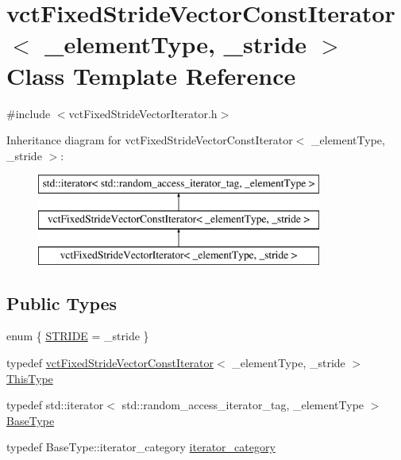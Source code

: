 \hypertarget{classvct_fixed_stride_vector_const_iterator}{}\section{vct\+Fixed\+Stride\+Vector\+Const\+Iterator$<$ \+\_\+element\+Type, \+\_\+stride $>$ Class Template Reference}
\label{classvct_fixed_stride_vector_const_iterator}


{\ttfamily \#include $<$vct\+Fixed\+Stride\+Vector\+Iterator.\+h$>$}

Inheritance diagram for vct\+Fixed\+Stride\+Vector\+Const\+Iterator$<$ \+\_\+element\+Type, \+\_\+stride $>$\+:\begin{figure}[H]
\begin{center}
\leavevmode
\includegraphics[height=3.000000cm]{d4/d1e/classvct_fixed_stride_vector_const_iterator}
\end{center}
\end{figure}
\subsection*{Public Types}
\begin{DoxyCompactItemize}
\item 
enum \{ \hyperlink{classvct_fixed_stride_vector_const_iterator_ad9c45d45b581c90996fb9064a14df79ca94922a822d949144352b904c2a75564d}{S\+T\+R\+I\+D\+E} = \+\_\+stride
 \}
\item 
typedef \hyperlink{classvct_fixed_stride_vector_const_iterator}{vct\+Fixed\+Stride\+Vector\+Const\+Iterator}$<$ \+\_\+element\+Type, \+\_\+stride $>$ \hyperlink{classvct_fixed_stride_vector_const_iterator_ac60fc9d8c2af56a7f251d9a7040efa1e}{This\+Type}
\item 
typedef std\+::iterator$<$ std\+::random\+\_\+access\+\_\+iterator\+\_\+tag, \+\_\+element\+Type $>$ \hyperlink{classvct_fixed_stride_vector_const_iterator_ad92100e30e7cbc86c778a0a01a1d19e5}{Base\+Type}
\item 
typedef Base\+Type\+::iterator\+\_\+category \hyperlink{classvct_fixed_stride_vector_const_iterator_adda9caa49222d747d94b783c74fb95eb}{iterator\+\_\+category}
\end{DoxyCompactItemize}
